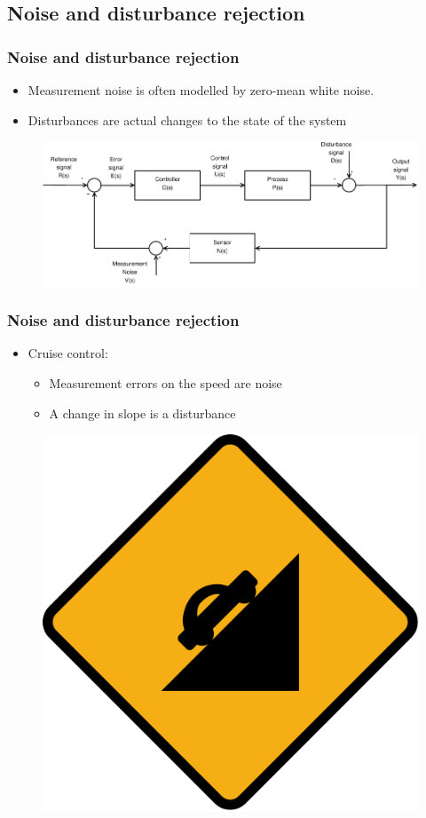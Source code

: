 \subsection[Noise and disturbance rejection]{Noise and disturbance rejection}

\begin{frame}
	\frametitle{Noise and disturbance rejection}
	\begin{block}{}
		\begin{itemize}
			\item Measurement noise is often modelled by zero-mean white noise.
			\item Disturbances are actual changes to the state of the system
		\end{itemize}
		\vspace{-1em}
		\begin{figure}
		\centering
		\includegraphics[width=0.8\linewidth]{Closed-Loop-measure}
		\label{fig:Closed-Loop3}
		\end{figure}
	\end{block}
\end{frame}


\begin{frame}
	\frametitle{Noise and disturbance rejection}
		\begin{itemize}
			\item Cruise control: \\
			\begin{itemize}
				\item Measurement errors on the speed are noise 
				\item A change in slope is a disturbance
			\end{itemize}
		\end{itemize}
		\begin{figure}
			\centering
			\includegraphics[width=0.45\linewidth]{control-goals/steep-road}
			\label{fig:cruisecontrol}
		\end{figure}
\end{frame}

